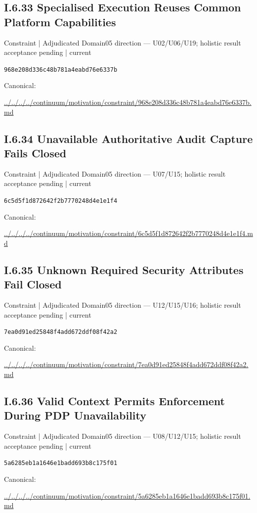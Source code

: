 \documentclass[10pt,a4paper]{article}
\begin{document}
\subsection*{I.6.33 Specialised Execution Reuses Common Platform Capabilities}
\label{element-968e208d336c48b781a4eabd76e6337b}
{\small Constraint | Adjudicated Domain05 direction — U02/U06/U19; holistic result acceptance pending | current}\par
\texttt{968e208d336c48b781a4eabd76e6337b}\par
Canonical: \par
{\footnotesize\url{../../../../continuum/motivation/constraint/968e208d336c48b781a4eabd76e6337b.md}}\par
\subsection*{I.6.34 Unavailable Authoritative Audit Capture Fails Closed}
\label{element-6c5d5f1d872642f2b7770248d4e1e1f4}
{\small Constraint | Adjudicated Domain05 direction — U07/U15; holistic result acceptance pending | current}\par
\texttt{6c5d5f1d872642f2b7770248d4e1e1f4}\par
Canonical: \par
{\footnotesize\url{../../../../continuum/motivation/constraint/6c5d5f1d872642f2b7770248d4e1e1f4.md}}\par
\subsection*{I.6.35 Unknown Required Security Attributes Fail Closed}
\label{element-7ea0d91ed25848f4add672ddf08f42a2}
{\small Constraint | Adjudicated Domain05 direction — U12/U15/U16; holistic result acceptance pending | current}\par
\texttt{7ea0d91ed25848f4add672ddf08f42a2}\par
Canonical: \par
{\footnotesize\url{../../../../continuum/motivation/constraint/7ea0d91ed25848f4add672ddf08f42a2.md}}\par
\subsection*{I.6.36 Valid Context Permits Enforcement During PDP Unavailability}
\label{element-5a6285eb1a1646e1badd693b8c175f01}
{\small Constraint | Adjudicated Domain05 direction — U08/U12/U15; holistic result acceptance pending | current}\par
\texttt{5a6285eb1a1646e1badd693b8c175f01}\par
Canonical: \par
{\footnotesize\url{../../../../continuum/motivation/constraint/5a6285eb1a1646e1badd693b8c175f01.md}}\par
\end{document}
